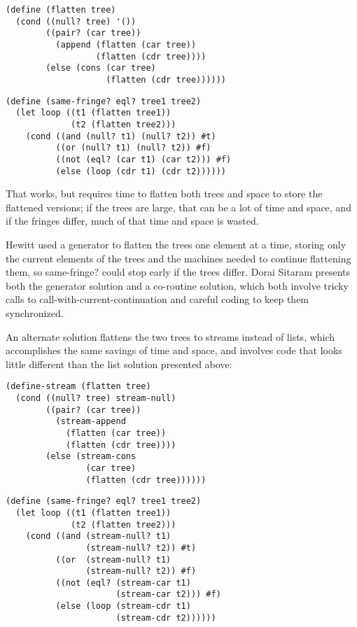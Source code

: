 \begin{verbatim}
(define (flatten tree)
  (cond ((null? tree) '())
        ((pair? (car tree))
          (append (flatten (car tree))
                  (flatten (cdr tree))))
        (else (cons (car tree)
                    (flatten (cdr tree))))))
\end{verbatim}

\begin{verbatim}
(define (same-fringe? eql? tree1 tree2)
  (let loop ((t1 (flatten tree1))
             (t2 (flatten tree2)))
    (cond ((and (null? t1) (null? t2)) #t)
          ((or (null? t1) (null? t2)) #f)
          ((not (eql? (car t1) (car t2))) #f)
          (else (loop (cdr t1) (cdr t2))))))
\end{verbatim}

That works, but requires time to flatten both trees and space to store
the flattened versions; if the trees are large, that can be a lot of
time and space, and if the fringes differ, much of that time and space
is wasted.

Hewitt used a generator to flatten the trees one element at a time,
storing only the current elements of the trees and the machines needed
to continue flattening them, so same-fringe? could stop early if the
trees differ. Dorai Sitaram presents both the generator solution and a
co-routine solution, which both involve tricky calls to
call-with-current-continuation and careful coding to keep them
synchronized.

An alternate solution flattens the two trees to streams instead of
lists, which accomplishes the same savings of time and space, and
involves code that looks little different than the list solution
presented above:

\begin{verbatim}
(define-stream (flatten tree)
  (cond ((null? tree) stream-null)
        ((pair? (car tree))
          (stream-append
            (flatten (car tree))
            (flatten (cdr tree))))
        (else (stream-cons
                (car tree)
                (flatten (cdr tree))))))
\end{verbatim}

\begin{verbatim}
(define (same-fringe? eql? tree1 tree2)
  (let loop ((t1 (flatten tree1))
             (t2 (flatten tree2)))
    (cond ((and (stream-null? t1)
                (stream-null? t2)) #t)
          ((or  (stream-null? t1)
                (stream-null? t2)) #f)
          ((not (eql? (stream-car t1)
                      (stream-car t2))) #f)
          (else (loop (stream-cdr t1)
                      (stream-cdr t2))))))
\end{verbatim}

